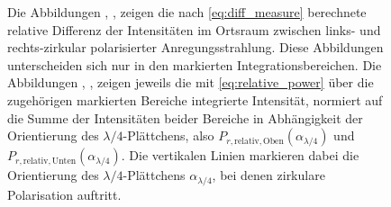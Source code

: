 \documentclass[a4paper, titlepage,  ngerman, fullpage]{book}
\begin{document}
\begin{figure}
			\caption[Differenz- und Integrationsdaten PSHE Ortsraum]{Die Abbildungen , ,  zeigen die nach \eqref{eq:diff_measure} berechnete relative Differenz der Intensitäten im Ortsraum zwischen links- und rechts-zirkular polarisierter Anregungsstrahlung. Diese Abbildungen unterscheiden sich nur in den markierten Integrationsbereichen. Die Abbildungen , ,  zeigen jeweils die mit \eqref{eq:relative_power} über die zugehörigen markierten Bereiche integrierte Intensität, normiert auf die Summe der Intensitäten beider Bereiche in Abhängigkeit der Orientierung des $\lambda/4$-Plättchens, also $P_{r, \mathrm{relativ}, \mathrm{Oben}}(\alpha_{\lambda/4})$ und $P_{r, \mathrm{relativ}, \mathrm{Unten}}(\alpha_{\lambda/4})$. Die vertikalen Linien markieren dabei die Orientierung des $\lambda/4$-Plättchens $\alpha_{\lambda/4}$, bei denen zirkulare Polarisation auftritt.}
			\label{fig:spin_hall_measure_diff_fp}
		\end{figure}
\end{document}
